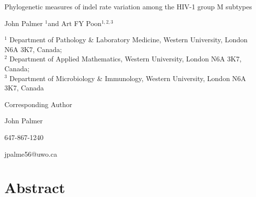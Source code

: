 \documentclass[12pt]{article}
\begin{document}
\baselineskip 24pt
\begin{flushleft}

{\LARGE Phylogenetic measures of indel rate variation among the HIV-1 group M subtypes}  %

{John Palmer $^{1}$and Art FY Poon$^{1,2,3}$}

\baselineskip 16pt

$^1$ Department of Pathology \& Laboratory Medicine, Western University, London N6A 3K7, Canada;\\
$^2$ Department of Applied Mathematics, Western University, London N6A 3K7, Canada;\\
$^3$ Department of Microbiology \& Immunology, Western University, London N6A 3K7, Canada
\end{flushleft}



\vspace*{\fill}
\baselineskip 0pt

\begin{flushright}
Corresponding Author

John Palmer

647-867-1240

jpalme56@uwo.ca
\end{flushright}
\newpage


\onehalfspacing
\pagewiselinenumbers

\section* {Abstract}
\end{document}
